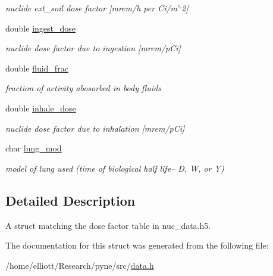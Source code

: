 \begin{DoxyCompactItemize}
\begin{DoxyCompactList}\small\item\em nuclide ext\-\_\-soil dose factor \mbox{[}mrem/h per Ci/m$^\wedge$2\mbox{]} \end{DoxyCompactList}\item 
\hypertarget{structpyne_1_1dose_a96dc0ff17888672afb40c82b3c6bb996}{double \hyperlink{structpyne_1_1dose_a96dc0ff17888672afb40c82b3c6bb996}{ingest\-\_\-dose}}\label{structpyne_1_1dose_a96dc0ff17888672afb40c82b3c6bb996}

\begin{DoxyCompactList}\small\item\em nuclide dose factor due to ingestion \mbox{[}mrem/p\-Ci\mbox{]} \end{DoxyCompactList}\item 
\hypertarget{structpyne_1_1dose_ac5aad706f373cee64e286f6191f753c2}{double \hyperlink{structpyne_1_1dose_ac5aad706f373cee64e286f6191f753c2}{fluid\-\_\-frac}}\label{structpyne_1_1dose_ac5aad706f373cee64e286f6191f753c2}

\begin{DoxyCompactList}\small\item\em fraction of activity abosorbed in body fluids \end{DoxyCompactList}\item 
\hypertarget{structpyne_1_1dose_ade66b3422bf24883142e0de856d67228}{double \hyperlink{structpyne_1_1dose_ade66b3422bf24883142e0de856d67228}{inhale\-\_\-dose}}\label{structpyne_1_1dose_ade66b3422bf24883142e0de856d67228}

\begin{DoxyCompactList}\small\item\em nuclide dose factor due to inhalation \mbox{[}mrem/p\-Ci\mbox{]} \end{DoxyCompactList}\item 
\hypertarget{structpyne_1_1dose_afc70c9461a6c1e3348a90e66747db41e}{char \hyperlink{structpyne_1_1dose_afc70c9461a6c1e3348a90e66747db41e}{lung\-\_\-mod}}\label{structpyne_1_1dose_afc70c9461a6c1e3348a90e66747db41e}

\begin{DoxyCompactList}\small\item\em model of lung used (time of biological half life-- D, W, or Y) \end{DoxyCompactList}\end{DoxyCompactItemize}


\subsection{Detailed Description}
A struct matching the dose factor table in nuc\-\_\-data.\-h5. 

The documentation for this struct was generated from the following file\-:\begin{DoxyCompactItemize}
\item 
/home/elliott/\-Research/pyne/src/\hyperlink{data_8h}{data.\-h}\end{DoxyCompactItemize}
